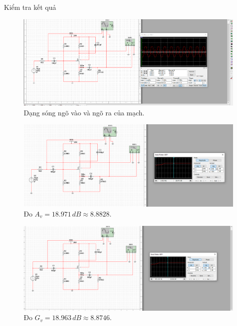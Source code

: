 Kiểm tra kết quả

\begin{figure}[H]
	\centering
	\includegraphics[width=\linewidth]{./my-chapters/my-images/Question1/Câu 1 Hình 2 b - Sóng.png}
	\caption{Dạng sóng ngõ vào và ngõ ra của mạch.}
\end{figure}

\begin{figure}[H]
	\centering
	\includegraphics[width=\linewidth]{./my-chapters/my-images/Question1/Câu 1 Hình 2 b - Av.png}
	\caption{Đo $A_{v} = 18.971\, dB \approx 8.8828$.}
\end{figure}

\begin{figure}[H]
	\centering
	\includegraphics[width=\linewidth]{./my-chapters/my-images/Question1/Câu 1 Hình 2 b - Gv.png}
	\caption{Đo $G_{v} = 18.963\,dB \approx 8.8746$.}
\end{figure}

